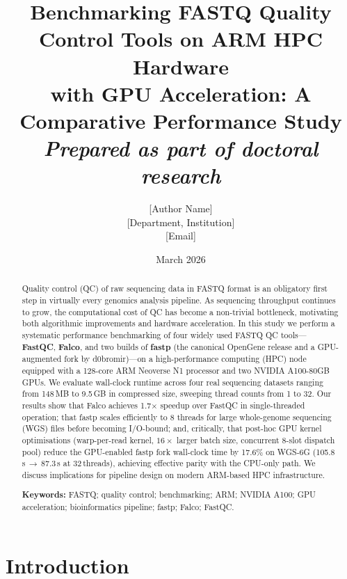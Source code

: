 \documentclass[a4paper,12pt]{article}
\title{%
  \large \textbf{Benchmarking FASTQ Quality Control Tools on ARM HPC Hardware\\
  with GPU Acceleration: A Comparative Performance Study}\\[1em]
  \normalsize \textit{Prepared as part of doctoral research}
}
\author{
  [Author Name]\\
  \small [Department, Institution]\\
  \small [Email]
}
\date{March 2026}
\begin{document}

\maketitle
\thispagestyle{fancy}

\begin{abstract}
\noindent
Quality control (QC) of raw sequencing data in FASTQ format is an obligatory
first step in virtually every genomics analysis pipeline.  As sequencing
throughput continues to grow, the computational cost of QC has become a
non-trivial bottleneck, motivating both algorithmic improvements and hardware
acceleration.  In this study we perform a systematic performance benchmarking
of four widely used FASTQ QC tools---\textbf{FastQC}, \textbf{Falco}, and two
builds of \textbf{fastp} (the canonical OpenGene release and a GPU-augmented
fork by d0bromir)---on a high-performance computing (HPC) node equipped with a
128-core ARM Neoverse N1 processor and two NVIDIA A100-80GB GPUs.  We evaluate
wall-clock runtime across four real sequencing datasets ranging from 148\,MB to
9.5\,GB in compressed size, sweeping thread counts from 1 to 32.  Our results
show that Falco achieves 1.7$\times$ speedup over FastQC in single-threaded
operation; that fastp scales efficiently to 8 threads for large whole-genome
sequencing (WGS) files before becoming I/O-bound; and, critically, that
post-hoc GPU kernel optimisations (warp-per-read kernel, $16\times$ larger
batch size, concurrent 8-slot dispatch pool) reduce the GPU-enabled fastp fork
wall-clock time by 17.6\% on WGS-6G (105.8\,s\,$\to$\,87.3\,s at
32\,threads), achieving effective parity with the CPU-only path.  We discuss
implications for pipeline design on modern ARM-based HPC infrastructure.

\medskip
\noindent\textbf{Keywords:} FASTQ; quality control; benchmarking; ARM; NVIDIA
A100; GPU acceleration; bioinformatics pipeline; fastp; Falco; FastQC.
\end{abstract}

\newpage
\tableofcontents
\newpage

\section{Introduction}
\end{document}
